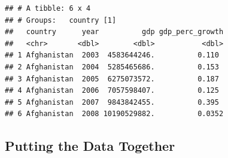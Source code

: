 \documentclass[12pt,]{article}
\newenvironment{Shaded}{\begin{snugshade}}{\end{snugshade}}
\newcommand{\DataTypeTok}[1]{\textcolor[rgb]{0.13,0.29,0.53}{#1}}
\newcommand{\KeywordTok}[1]{\textcolor[rgb]{0.13,0.29,0.53}{\textbf{#1}}}
\newcommand{\NormalTok}[1]{#1}
\newcommand{\OperatorTok}[1]{\textcolor[rgb]{0.81,0.36,0.00}{\textbf{#1}}}
\newcommand{\StringTok}[1]{\textcolor[rgb]{0.31,0.60,0.02}{#1}}
\begin{document}
\begin{verbatim}
## # A tibble: 6 x 4
## # Groups:   country [1]
##   country      year          gdp gdp_perc_growth
##   <chr>       <dbl>        <dbl>           <dbl>
## 1 Afghanistan  2003  4583644246.          0.110 
## 2 Afghanistan  2004  5285465686.          0.153 
## 3 Afghanistan  2005  6275073572.          0.187 
## 4 Afghanistan  2006  7057598407.          0.125 
## 5 Afghanistan  2007  9843842455.          0.395 
## 6 Afghanistan  2008 10190529882.          0.0352
\end{verbatim}

\hypertarget{putting-the-data-together}{%
\subsection{Putting the Data Together}\label{putting-the-data-together}}

\begin{Shaded}
\end{Shaded}
\end{document}
